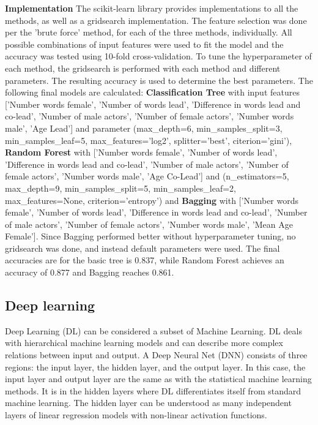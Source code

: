 \documentclass{article}
\begin{document}
\textbf{Implementation}
The scikit-learn library provides implementations to all the methods, as well as a gridsearch implementation. The feature selection was done per the 'brute force' method, for each of the three methods, individually. All possible combinations of input features were used to fit the model and the accuracy was tested using 10-fold cross-validation. To tune the hyperparameter of each method, the gridsearch is performed with each method and different parameters. The resulting accuracy is used to determine the best parameters. The following final models are calculated: \textbf{Classification Tree} with input features ['Number words female', 'Number of words lead', 'Difference in words lead and co-lead', 'Number of male actors', 'Number of female actors', 'Number words male', 'Age Lead'] and parameter (max\_depth=6, min\_samples\_split=3, min\_samples\_leaf=5, max\_features='log2', splitter='best', citerion='gini'), \textbf{Random Forest} with ['Number words female', 'Number of words lead', 'Difference in words lead and co-lead', 'Number of male actors', 'Number of female actors', 'Number words male', 'Age Co-Lead'] and (n\_estimators=5, max\_depth=9, min\_samples\_split=5, min\_samples\_leaf=2, max\_features=None, criterion='entropy') and \textbf{Bagging} with ['Number words female', 'Number of words lead', 'Difference in words lead and co-lead', 'Number of male actors', 'Number of female actors', 'Number words male', 'Mean Age Female']. Since Bagging performed better without hyperparameter tuning, no gridsearch was done, and instead default parameters were used. The final accuracies are for the basic tree is 0.837, while Random Forest achieves an accuracy of 0.877 and Bagging reaches 0.861.

\subsection{Deep learning}
Deep Learning (DL) can be considered a subset of Machine Learning. DL deals with hierarchical machine learning models and can describe more complex relations between input and output. A Deep Neural Net (DNN) consists of three regions: the input layer, the hidden layer, and the output layer. In this case, the input layer and output layer are the same as with the statistical machine learning methods. It is in the hidden layers where DL differentiates itself from standard machine learning. The hidden layer can be understood as many independent layers of linear regression models with non-linear activation functions. 
\end{document}
